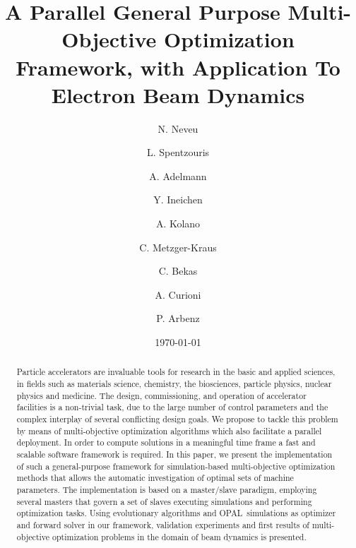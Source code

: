 \documentclass[%
preprint,
preprint,
linenumbers,
amsmath,amssymb,
aps,
prstab,
]{revtex4-1}
\begin{document}
\title{A Parallel General Purpose Multi-Objective Optimization Framework,
  with Application To Electron Beam Dynamics}



\author{N. Neveu}

\author{L. Spentzouris}

\author{A. Adelmann}
\author{Y. Ineichen }
\author{A. Kolano}
\author{C. Metzger-Kraus}
%

\author{C. Bekas}
\author{A. Curioni}

%

\author{P. Arbenz}
%

\date{\today}%


\begin{abstract}
Particle accelerators are invaluable tools for research in the basic and
  applied sciences, in fields such as materials science, chemistry,
  the biosciences, particle physics, nuclear physics and medicine.
The design, commissioning, and operation of accelerator facilities is a
  non-trivial task, due to the large number of control parameters and the
  complex interplay of several conflicting design goals.
We propose to tackle this problem by means of multi-objective optimization
  algorithms which also facilitate a parallel deployment.
In order to compute solutions in a meaningful time frame a fast 
  and scalable software framework is required.
In this paper, we present the implementation of such a general-purpose
  framework for simulation-based multi-objective optimization methods that
  allows the automatic investigation of optimal sets of machine parameters.
The implementation is based on a master/slave paradigm, employing several
  masters that govern a set of slaves executing simulations and performing
  optimization tasks.
Using evolutionary algorithms and \textsc{OPAL}~simulations as optimizer and
  forward solver in our framework, validation experiments and first
  results of multi-objective optimization problems in the domain of beam
  dynamics is presented.
  
\end{abstract}
\end{document}
